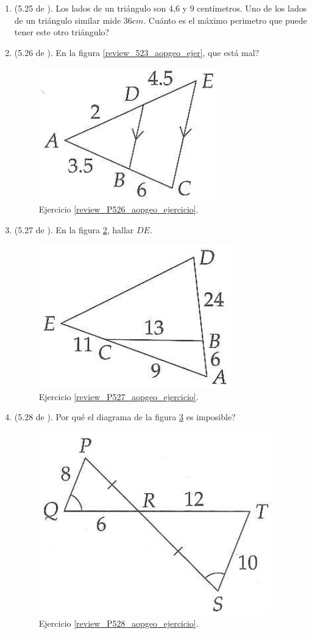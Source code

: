 \begin{enumerate}
		\item \label{review_P525_aopgeo_ejercicio} (5.25 de \cite{Aops_Geometria}). Los lados de un triángulo son 4,6 y 9 centímetros. Uno de los lados de un triángulo similar mide $36cm$. Cuánto es el máximo perimetro que puede tener este otro triángulo?
		
		\item \label{review_P526_aopgeo_ejercicio} (5.26 de \cite{Aops_Geometria}). En la figura \ref{review_523_aopgeo_ejer}, que está mal?
		\begin{figure}[H]
			\centering
			\includegraphics[width=0.35\linewidth]{Geometria/imgs/review_526_aopgeo_ejer}
			\caption{Ejercicio \ref{review_P526_aopgeo_ejercicio}.}
			\label{review_526_aopgeo_ejer}
		\end{figure}
		
		\item \label{review_P527_aopgeo_ejercicio} (5.27 de \cite{Aops_Geometria}). En la figura \ref{review_527_aopgeo_ejer}, hallar $DE$.
		\begin{figure}[H]
			\centering
			\includegraphics[width=0.3\linewidth]{Geometria/imgs/review_527_aopgeo_ejer}
			\caption{Ejercicio \ref{review_P527_aopgeo_ejercicio}.}
			\label{review_527_aopgeo_ejer}
		\end{figure}
		
		\item \label{review_P528_aopgeo_ejercicio} (5.28 de \cite{Aops_Geometria}). Por qué el diagrama de la figura \ref{review_528_aopgeo_ejer} es imposible?
		\begin{figure}[H]
			\centering
			\includegraphics[width=0.4\linewidth]{Geometria/imgs/review_528_aopgeo_ejer}
			\caption{Ejercicio \ref{review_P528_aopgeo_ejercicio}.}
			\label{review_528_aopgeo_ejer}
		\end{figure}
		

\end{enumerate}
